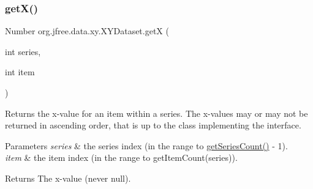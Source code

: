 \subsubsection{\texorpdfstring{get\+X()}{getX()}}
{\footnotesize\ttfamily Number org.\+jfree.\+data.\+xy.\+X\+Y\+Dataset.\+getX (\begin{DoxyParamCaption}\item[{int}]{series,  }\item[{int}]{item }\end{DoxyParamCaption})}

Returns the x-\/value for an item within a series. The x-\/values may or may not be returned in ascending order, that is up to the class implementing the interface.


\begin{DoxyParams}{Parameters}
{\em series} & the series index (in the range {} to {\ttfamily \mbox{\hyperlink{interfaceorg_1_1jfree_1_1data_1_1general_1_1_series_dataset_a84fe822f5918f941d9de1ed1b73c9f58}{get\+Series\+Count()}} -\/ 1}). \\
\hline
{\em item} & the item index (in the range {} to {\ttfamily get\+Item\+Count(series)}).\\
\hline
\end{DoxyParams}
\begin{DoxyReturn}{Returns}
The x-\/value (never {\ttfamily null}). 
\end{DoxyReturn}


